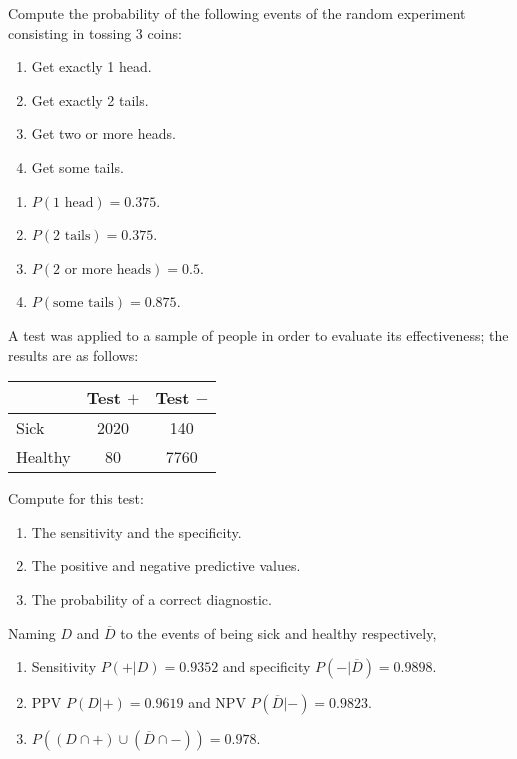 {Compute the probability of the following events of the random experiment consisting in tossing 3 coins: 
\begin{enumerate}
\item Get exactly 1 head. 
\item Get exactly 2 tails.
\item Get two or more heads.
\item Get some tails. 
\end{enumerate}
}
{
\begin{enumerate}
\item $P(\mbox{1 head})=0.375$. 
\item $P(\mbox{2 tails})=0.375$. 
\item $P(\mbox{2 or more heads})=0.5$. 
\item $P(\mbox{some tails})=0.875$.
\end{enumerate}
}
{}


{A test was applied to a sample of people in order to evaluate its effectiveness; the results are as follows:

\begin{center}
\begin{tabular}{|l|c|c|}
\cline{2-3}
\multicolumn{1}{l|}{} & Test $+$ & Test $-$ \\
\hline
Sick & 2020 & 140 \\
\hline
Healthy & 80 & 7760 \\
\hline
\end{tabular}
\end{center}

Compute for this test:
\begin{enumerate}
\item The sensitivity and the specificity.
\item The positive and negative predictive values.
\item The probability of a correct diagnostic. 
\end{enumerate}
}
{Naming $D$ and $\overline D$ to the events of being sick and healthy respectively,
\begin{enumerate}
\item Sensitivity $P(+|D)=0.9352$ and specificity $P(-|\overline D)=0.9898$. 
\item PPV $P(D|+)=0.9619$ and NPV $P(\overline D|-)=0.9823$.
\item $P((D\cap +)\cup (\overline D\cap -))= 0.978$.
\end{enumerate}
}
{}


